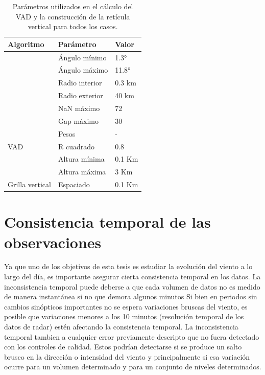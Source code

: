 \documentclass[12pt,spanish,oneside, a4paper]{book}
\begin{document}
\begin{table}

\caption{\label{tab:parametros}Parámetros utilizados en el cálculo del VAD y la construcción de la retícula vertical para todos los casos. \label{parametros}}
\centering
\begin{tabular}[t]{lll}
\toprule
Algoritmo & Parámetro & Valor\\
\midrule
 & Ángulo mínimo & 1.3°\\
\cmidrule{2-3}
 & Ángulo máximo & 11.8°\\
\cmidrule{2-3}
 & Radio interior & 0.3 km\\
\cmidrule{2-3}
 & Radio exterior & 40 km\\
\cmidrule{2-3}
 & NaN máximo & 72\\
\cmidrule{2-3}
 & Gap máximo & 30\\
\cmidrule{2-3}
 & Pesos & -\\
\cmidrule{2-3}
\multirow{-8}{*}{\raggedright\arraybackslash VAD} & R cuadrado & 0.8\\
\cmidrule{1-3}
 & Altura mínima & 0.1 Km\\
\cmidrule{2-3}
 & Altura máxima & 3 Km\\
\cmidrule{2-3}
\multirow{-3}{*}{\raggedright\arraybackslash Grilla vertical} & Espaciado & 0.1 Km\\
\bottomrule
\end{tabular}
\end{table}

\section{Consistencia temporal de las
observaciones}\label{consistencia-temporal-de-las-observaciones}

Ya que uno de los objetivos de esta tesis es estudiar la evolución del
viento a lo largo del día, es importante asegurar cierta consistencia
temporal en los datos. La inconsistencia temporal puede deberse a que
cada volumen de datos no es medido de manera instantánea si no que
demora algunos minutos Si bien en periodos sin cambios sinópticos
importantes no se espera variaciones bruscas del viento, es posible que
variaciones menores a los 10 minutos (resolución temporal de los datos
de radar) estén afectando la consistencia temporal. La inconsistencia
temporal tambien a cualquier error previamente descripto que no fuera
detectado con los controles de calidad. Estos podrían detectarse si se
produce un salto brusco en la dirección o intensidad del viento y
principalmente si esa variación ocurre para un volumen determinado y
para un conjunto de niveles determinados.
\end{document}
